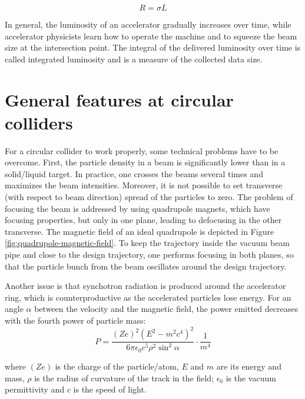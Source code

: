 \documentclass[encoding=utf8,british]{tumphthesis}
\begin{document}
\begin{equation}
    R =  \sigma L
    \label{eq:particle-rate}
\end{equation}

In general, the luminosity of an accelerator gradually increases over time, while accelerator physicists learn how to operate the machine and to squeeze the beam size at the intersection point. The integral of the delivered luminosity over time is called integrated luminosity and is a measure of the collected data size. 


\section{General features at circular colliders}

For a circular collider to work properly, some technical problems have to be overcome. First, the particle density in a beam is significantly lower than in a solid/liquid target. In practice, one crosses the beams several times and maximizes the beam intensities.  Moreover, it is not possible to set transverse (with respect to beam direction) spread of the particles to zero. The problem of focusing the beam is addressed by using quadrupole magnets, which have focusing properties, but only in one plane, leading to defocusing in the other transverse. The magnetic field of an ideal quadrupole is depicted in Figure \ref{fig:quadrupole-magnetic-field}. To keep the trajectory inside the vacuum beam pipe and close to the design trajectory, one performs focusing in both planes, so that the  particle bunch from the beam oscillates around the design trajectory.



Another issue is that synchotron radiation is produced around the accelerator ring, which is counterproductive as the accelerated particles lose energy. For an angle $\alpha$  between the velocity and the magnetic field, the power emitted decreases with the fourth power of particle mass:
\begin{equation}
    P = \frac{(Ze)^2 (E^2 - m^2 c^4)^2}{6 \pi \epsilon_0 c^5 \rho^2 \sin^2{\alpha}} \cdot \frac{1}{m^4}
    \label{eq:syncrotron-radiation}
\end{equation}

where $(Ze)$ is the charge of the particle/atom, $E$ and $m$ are its energy and mass, $\rho$ is the radius of curvature of the track in the field; $\epsilon_0$ is 
the vacuum permittivity and $c$ is the speed of light.
\end{document}
